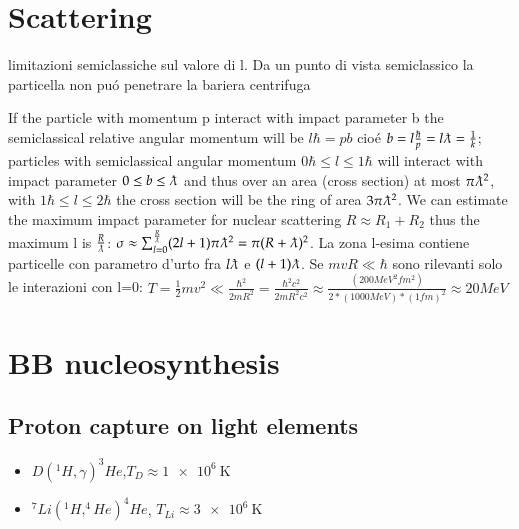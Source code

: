 \documentclass[main.tex]{subfiles}
\begin{document}
\chapter{Scattering}

limitazioni semiclassiche sul valore di l.
Da un punto di vista semiclassico la particella non pu\'o penetrare la bariera centrifuga
If the particle with momentum p interact with impact parameter b the semiclassical relative angular momentum will be $l\hbar=pb$ cio\'e $b=l\frac{\hbar}{p}=l\lambdabar=\frac{1}{k}$; particles with semiclassical angular momentum $0\hbar\leq l\leq1 \hbar$  will interact with impact parameter $0\leq b\leq \lambdabar$ and thus over an area (cross section) at most $\pi\lambdabar^2$, with $1\hbar\leq l\leq2\hbar$ the cross section will be the ring of area $3\pi\lambdabar^2$. We can estimate the maximum impact parameter for nuclear scattering $R\approx R_1+R_2$ thus the maximum l is $\frac{R}{\lambdabar}$: $\sigma\approx\sum_{l=0}^{\frac{R}{\lambdabar}}(2l+1)\pi\lambdabar^2=\pi(R+\lambdabar)^2$.
La zona l-esima contiene particelle con parametro d'urto fra $l\lambdabar$ e $(l+1)\lambdabar$. Se $mvR\ll\hbar$ sono rilevanti solo le interazioni con l=0: $T=\frac{1}{2}mv^2\ll\frac{\hbar^2}{2mR^2}=\frac{\hbar^2c^2}{2mR^2c^2}\approx\frac{(200 MeV^2 fm^2)}{2*(1000 MeV) *(1 fm)^2}\approx 20 MeV$

\chapter{BB nucleosynthesis}
\PartialToc

\section{Proton capture on light elements}

\begin{itemize}
\item $D(^1H,\gamma)^3He$,$T_D\approx \SI{1e6}{\kelvin}$
\item $^7Li(^1H,^4He)^4He$, $T_{Li}\approx\SI{3e6}{\kelvin}$ 

\end{itemize}
\end{document}
